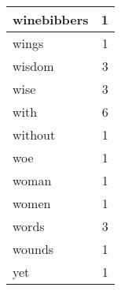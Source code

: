 \begin{center}
\begin{longtable}{l|r}
winebibbers & 1\\ \hline 
wings & 1\\ \hline 
wisdom & 3\\ \hline 
wise & 3\\ \hline 
with & 6\\ \hline 
without & 1\\ \hline 
woe & 1\\ \hline 
woman & 1\\ \hline 
women & 1\\ \hline 
words & 3\\ \hline 
wounds & 1\\ \hline 
yet & 1\\ \hline 
\end{longtable}  
\end{center}  


  
\normalsize  

  
  
